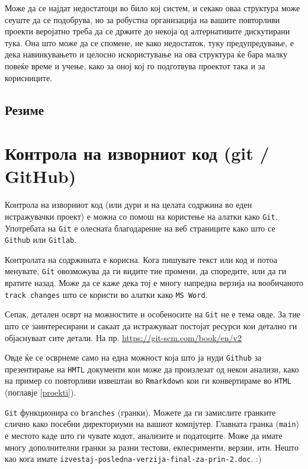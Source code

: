 \documentclass[
]{book}
\begin{document}
Може да се најдат недостатоци во било кој систем, и секако оваа структура може сеуште да се подобрува, но за робустна организација на вашите повторливи проекти веројатно треба да се држите до некоја од алтернативите дискутирани тука. Она што може да се спомене, не како недостаток, туку предупредување, е дека навинкувањето и целосно искористување на ова структура ќе бара малку повеќе време и учење, како за оној кој го подготвува проектот така и за корисниците.

\hypertarget{ux440ux435ux437ux438ux43cux435-2}{%
\section{Резиме}\label{ux440ux435ux437ux438ux43cux435-2}}

\hypertarget{git}{%
\chapter{Контрола на изворниот код (git / GitHub)}\label{git}}

Контрола на изворниот код (или дури и на целата содржина во еден истражувачки проект) е можна со помош на користење на алатки како \texttt{Git}. Употребата на \texttt{Git} е олесната благодарение на веб страниците како што се \texttt{Github} или \texttt{Gitlab}.

Контролата на содржината е корисна. Кога пишувате текст или код и потоа менувате, \texttt{Git} овозможува да ги видите тие промени, да споредите, или да ги вратите назад. Може да се каже дека тој е многу напредна верзија на вообичаното \texttt{track\ changes} што се користи во алатки како \texttt{MS\ Word}.

Сепак, детален осврт на можностите и особеносите на \texttt{Git} не е тема овде. За тие што се заинтересирани и сакаат да истражуваат постојат ресурси кои детално ги објаснуваат сите детали. На пр. \url{https://git-scm.com/book/en/v2}

Овде ќе се осврнеме само на една можност која што ја нуди \texttt{Github} за презентирање на \texttt{HMTL} документи кои може да произлезат од некои анализи, како на пример со повторливи извештаи во \texttt{Rmarkdown} кои ги конвертираме во \texttt{HTML} (поглавје \ref{proekti}).

\texttt{Git} функционира со \texttt{branches} (гранки). Можете да ги замислите гранките слично како посебни директориуми на вашиот компјутер. Главната гранка (\texttt{main}) е местото каде што ги чувате кодот, анализите и податоците. Може да имате многу дополнителни гранки за разни тестови, екпесрименти, верзии, итн. Нешто као кога имате \texttt{izvestaj-posledna-verzija-final-za-prin-2.doc}. :)
\end{document}
